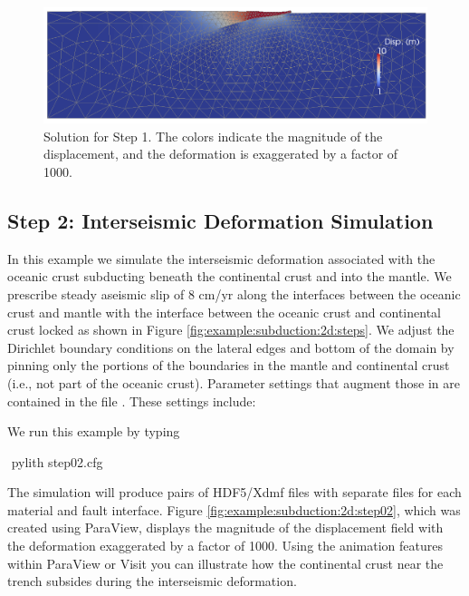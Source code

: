 \begin{figure}
  \includegraphics[width=4.5in]{examples/figs/subduction2d_step01_soln}
  \caption{Solution for Step 1. The colors indicate the magnitude of the displacement,
    and the deformation is exaggerated by a factor of 1000. }
  \label{fig:example:subduction:2d:step01}
\end{figure}


\subsection{Step 2: Interseismic Deformation Simulation}

In this example we simulate the interseismic deformation associated
with the oceanic crust subducting beneath the continental crust and
into the mantle. We prescribe steady aseismic slip of 8 cm/yr along
the interfaces between the oceanic crust and mantle with the interface
between the oceanic crust and continental crust locked as shown in
Figure \vref{fig:example:subduction:2d:steps}. We adjust the Dirichlet
boundary conditions on the lateral edges and bottom of the domain
by pinning only the portions of the boundaries in the mantle and continental
crust (i.e., not part of the oceanic crust). Parameter settings that
augment those in  are contained in the file
. These settings include:
\begin{inventory}
\end{inventory}
We run this example by typing
\begin{shell}
$$ pylith step02.cfg
\end{shell}
The simulation will produce pairs of HDF5/Xdmf files with separate
files for each material and fault interface. Figure
\vref{fig:example:subduction:2d:step02}, which was created using
ParaView, displays the magnitude of the displacement field with the
deformation exaggerated by a factor of 1000. Using the animation
features within ParaView or Visit you can illustrate how the
continental crust near the trench subsides during the interseismic
deformation.

